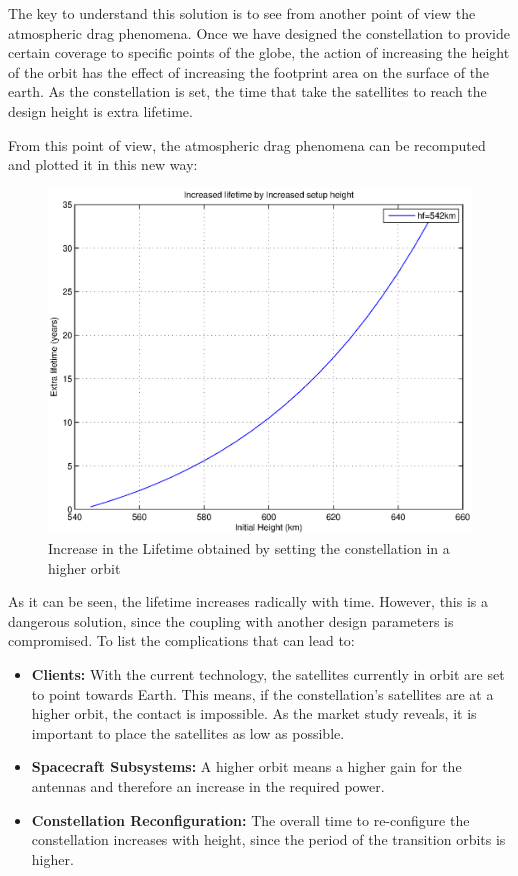 The key to understand this solution is to see from another point of view the atmospheric drag phenomena. Once we have designed the constellation to provide certain coverage to specific points of the globe, the action of increasing the height of the orbit has the effect of increasing the footprint area on the surface of the earth. As the constellation is set, the time that take the satellites to reach the design height is extra lifetime. 

From this point of view, the atmospheric drag phenomena can be recomputed and plotted it in this new way:

\begin{figure}[H]
\centering
\includegraphics[scale=0.7]{ExtraLifetime/ExtraLifetime.eps}
\caption{Increase in the Lifetime obtained by setting the constellation in a higher orbit}
\end{figure}

As it can be seen, the lifetime increases radically with time. However, this is a dangerous solution, since the coupling with another design parameters is compromised. To list the complications that can lead to:

\begin{itemize}
\item \textbf{Clients: }With the current technology, the satellites currently in orbit are set to point towards Earth. This means, if the constellation's satellites are at a higher orbit, the contact is impossible. As the market study reveals, it is important to place the satellites as low as possible.
\item \textbf{Spacecraft Subsystems: }A higher orbit means a higher gain for the antennas and therefore an increase in the required power.
\item \textbf{Constellation Reconfiguration: } The overall time to re-configure the constellation increases with height, since the period of the transition orbits is higher.
\end{itemize}


